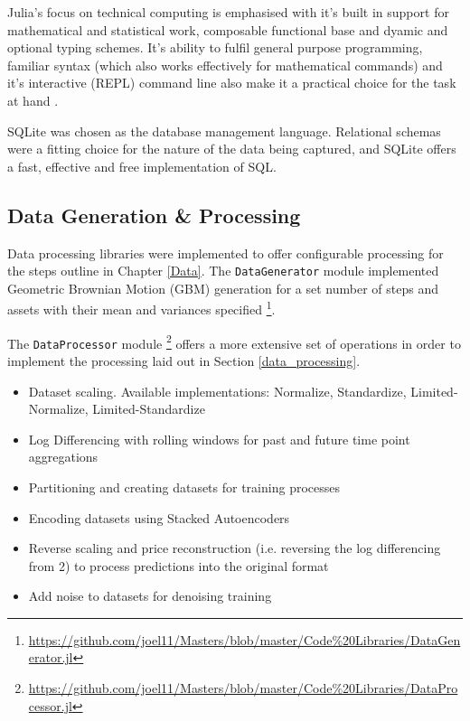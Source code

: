 \documentclass[a4paper,11pt,oneside]{article}
\theoremstyle{plain}
\theoremstyle{definition}
\begin{document}
	Julia's focus on technical computing is emphasised with it's built in support for mathematical and statistical work, composable functional base and dyamic and optional typing schemes. It's ability to fulfil general purpose programming, familiar syntax (which also works effectively for mathematical commands) and it's interactive (REPL) command line also make it a practical choice for the task at hand \cite{Perkel}.\newline
	
	SQLite was chosen as the database management language. Relational schemas were a fitting choice for the nature of the data being captured, and SQLite offers a fast, effective and free implementation of SQL.\newline
	
	
	\subsection{Data Generation \& Processing}
	
	Data processing libraries were implemented to offer configurable processing for the steps outline in Chapter \ref{Data}. The \texttt{DataGenerator} module implemented Geometric Brownian Motion (GBM) generation for a set number of steps and assets with their mean and variances specified \footnote{\url{https://github.com/joel11/Masters/blob/master/Code\%20Libraries/DataGenerator.jl}}. \newline
	
	The \texttt{DataProcessor} module \footnote{\url{https://github.com/joel11/Masters/blob/master/Code\%20Libraries/DataProcessor.jl}} offers a more extensive set of operations in order to implement the processing laid out in Section \ref{data_processing}.
	
	
	\begin{itemize}
		\item[1] Dataset scaling. Available implementations: Normalize, Standardize, Limited-Normalize, Limited-Standardize	
		\item[2] Log Differencing with rolling windows for past and future time point aggregations
		\item[3] Partitioning and creating datasets for training processes
		\item[4] Encoding datasets using Stacked Autoencoders
		\item[5] Reverse scaling and price reconstruction (i.e. reversing the log differencing from 2) to process predictions into the original format
		\item[6] Add noise to datasets for denoising training
	\end{itemize}
	
\end{document}
